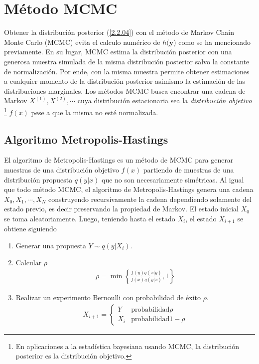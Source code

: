 \section{Método MCMC}

Obtener la distribución posterior (\ref{2.2.04}) con el método de Markov Chain Monte Carlo (MCMC) evita el calculo numérico de $h(\mathbf{y}$) como se ha mencionado previamente. En su lugar, MCMC estima la distribución posterior con una generosa muestra simulada de la misma distribución posterior salvo la constante de normalización. Por ende, con la misma muestra permite obtener estimaciones a cualquier momento de la distribución posterior asimismo la estimación de las distribuciones marginales. Los métodos MCMC busca encontrar una cadena de Markov $X^{(1)},X^{(2)},\cdots$ cuya distribución estacionaria sea la \textit{distribución objetivo} \footnote{En aplicaciones a la estadística bayesiana usando MCMC, la distribución posterior es la distribución objetivo.} $f(x)$ pese a que la misma no esté normalizada. 

\subsection*{Algoritmo Metropolis-Hastings}

El algoritmo de Metropolis-Hastings es un método de MCMC para generar muestras de una distribución objetivo $f(x)$ partiendo de muestras de una distribución propuesta $q(y|x)$ que no son necesariamente simétricas. Al igual que todo método MCMC, el algoritmo de Metropolis-Hastings genera una cadena $X_0, X_1, \cdots, X_N$ construyendo recursivamente la cadena dependiendo solamente del estado previo, es decir preservando la propiedad de Markov. El estado inicial $X_0$ se toma aleatoriamente. Luego, teniendo hasta el estado $X_i$, el estado $X_{i+1}$ se obtiene siguiendo 
\begin{enumerate}
    \item Generar una propuesta $Y \sim q(y|X_i)$.
    \item Calcular $\rho$ 
    \begin{align*}
        \rho = \min \left \{ \frac{f(y)q(x|y)}{f(x)q(y|x)}, 1  \right \} 
    \end{align*}
    \item Realizar un experimento Bernoulli con probabilidad de éxito $\rho$.
    \begin{align*}
        X_{i+1} = \left\{\begin{matrix}
            Y & \text{probabilidad} \rho  \\ 
            X_{i}& \text{probabilidad} 1- \rho  
           \end{matrix}\right.
    \end{align*}
\end{enumerate}

